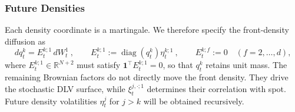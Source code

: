 \documentclass[smallextended,envcountsame,envcountsect]{svjour3}
\newcommand{\one}{\mathbf 1}
\begin{document}
      \subsubsection{Future Densities}
  \label{sec:future-densities}

       Each density coordinate
      is a martingale. We therefore specify the front-density diffusion as
      \[
        dq_t^k=E_t^{k;1}\,dW_t^1 \ ,
        \qquad
        E_t^{k;1}:=\operatorname{diag}(q_t^k)\eta_t^{k;1} \ ,
        \qquad E_t^{k;f}:=0\quad(f=2,\ldots,d),
      \]
      where $E_t^{k;1}\in\mathbb R^{N+2}$ must satisfy
      $\one^{\!\top}E_t^{k;1}=0$, so that $q_t^k$ retains unit mass. The
      remaining Brownian factors do not directly move the front density. They
      drive the stochastic DLV surface, while $\xi_t^{j,\cdot;1}$ determines their correlation with spot.
      Future density volatilities $\eta_t^j$ for $j>k$ will be obtained recursively.
\end{document}
